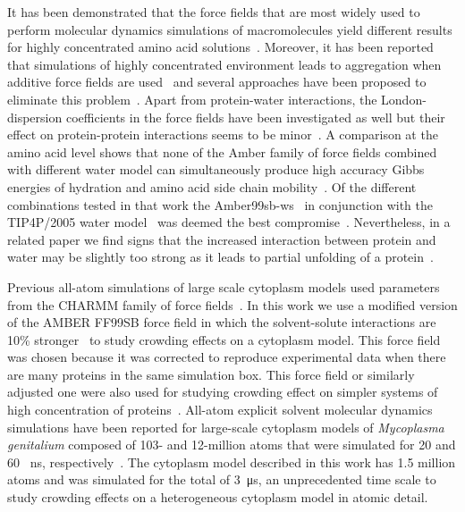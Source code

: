 \documentclass[journal=jcisd8,manuscript=article]{achemso}
\begin{document}
It has been demonstrated that the force fields that are most widely
used to perform molecular dynamics simulations of macromolecules yield
different results for highly concentrated amino acid
solutions~\cite{andrews2013}. Moreover, it has been reported that
simulations of highly concentrated environment leads to aggregation
when additive force fields are used~\cite{Petrov2014a,Abriata2015a,
  Nawrocki2017a} and several approaches have been proposed to
eliminate this
problem~\cite{Best2014a,Piana2015a,Bashardanesh2018b}. Apart from
protein-water interactions, the London-dispersion coefficients in the
force fields have been investigated as well but their effect on
protein-protein interactions seems to be
minor~\cite{Mohebifar2017a,Walters2018a,Bashardanesh2018b}.  A
comparison at the amino acid level shows that none of the Amber family
of force fields combined with different water model can simultaneously
produce high accuracy Gibbs energies of hydration and amino acid side
chain mobility~\cite{HZhang2018a}. Of the different combinations
tested in that work the Amber99sb-ws~\cite{Best2014a} in conjunction
with the TIP4P/2005 water model~\cite{Abascal2005b} was deemed the
best compromise~\cite{HZhang2018a}. Nevertheless, in a related paper
we find signs that the increased interaction between protein and water
may be slightly too strong as it leads to partial unfolding of a
protein~\cite{Bashardanesh2019a}.

Previous
all-atom simulations of large scale cytoplasm models used parameters from the CHARMM family of
force fields~\cite{Yu2016a}. In this work we use a modified version of
the AMBER FF99SB force field in which the solvent-solute interactions
are 10\% stronger~\cite{Best2014a} to study crowding effects on a
cytoplasm model. This force field was chosen because it was corrected
to reproduce experimental data when there are many proteins in the
same simulation box. This force field or similarly adjusted one were also used for studying crowding effect on simpler systems of high concentration of proteins~\cite{Nawrocki2017a,nawrocki2019,Bashardanesh2019a}. All-atom explicit solvent molecular dynamics simulations have been reported for large-scale cytoplasm models of
\textit{Mycoplasma genitalium} composed of 103- and 12-million atoms
that were simulated for 20 and 60 \SI{}{\nano\second},
respectively~\cite{Yu2016a}. The cytoplasm model described in this
work has 1.5 million atoms and was simulated for the total of
\SI{3}{\micro\second}, an unprecedented time scale to study crowding effects on a heterogeneous cytoplasm model in atomic detail.  
\end{document}
